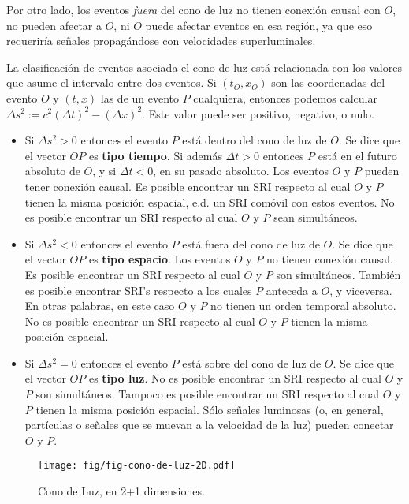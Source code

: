 Por otro lado, los eventos \textit{fuera} del cono de luz no tienen conexión causal con $O$, no pueden afectar a $O$, ni $O$ puede afectar eventos en esa región, ya que eso requeriría se\~nales propagándose con velocidades superluminales.

La clasificación de eventos asociada el cono de luz está relacionada con los valores que asume el intervalo entre dos eventos. Si $(t_O,x_O)$ son las coordenadas del evento $O$ y $(t,x)$ las de un evento $P$ cualquiera, entonces podemos calcular $\Delta s^2:=c^2(\Delta t)^2-(\Delta x)^2$. Este valor puede ser positivo, negativo, o nulo.
\begin{itemize}
\item Si $\Delta s^2>0$ entonces el evento $P$ está dentro del cono de luz de $O$. Se dice que el vector $OP$ es \textbf{tipo tiempo}. Si además $\Delta t>0$ entonces $P$ está en el futuro absoluto de $O$, y si $\Delta t<0$, en su pasado absoluto. Los eventos $O$ y $P$ pueden tener conexión causal. Es posible encontrar un SRI respecto al cual $O$ y $P$ tienen la misma posición espacial, e.d. un SRI comóvil con estos eventos. No es posible encontrar un SRI respecto al cual $O$ y $P$ sean simultáneos.

\item Si $\Delta s^2<0$ entonces el evento $P$ está fuera del cono de luz de $O$. Se dice que el vector $OP$ es \textbf{tipo espacio}. Los eventos $O$ y $P$ no tienen conexión causal. Es posible encontrar un SRI respecto al cual $O$ y $P$ son simultáneos. También es posible encontrar SRI's respecto a los cuales $P$ anteceda a $O$, y viceversa. En otras palabras, en este caso $O$ y $P$ no tienen un orden temporal absoluto. No es posible encontrar un SRI respecto al cual $O$ y $P$ tienen la misma posición espacial.

\item Si $\Delta s^2=0$ entonces el evento $P$ está sobre del cono de luz de $O$. Se dice que el vector $OP$ es \textbf{tipo luz}. No es posible encontrar un SRI respecto al cual $O$ y $P$ son  simultáneos. Tampoco es posible encontrar un SRI respecto al cual $O$ y $P$ tienen la misma posición espacial. Sólo se\~nales luminosas (o, en general, partículas o se\~nales que se muevan a la velocidad de la luz) pueden conectar $O$ y $P$.
\end{itemize}

\begin{figure}[t]
\centering\texttt{[image: fig/fig-cono-de-luz-2D.pdf]}
\caption{Cono de Luz, en 2+1 dimensiones.}
\end{figure}



